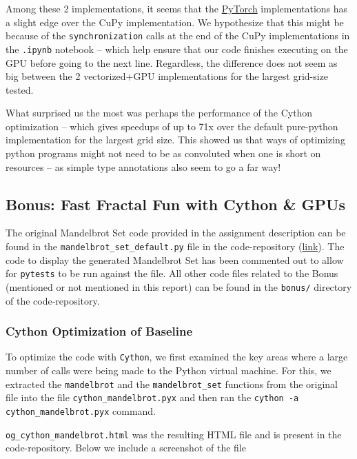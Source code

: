 \documentclass[a4paper,12pt]{article}
\begin{document}
Among these 2 implementations, it seems that the \underline{PyTorch} implementations has a slight edge over the CuPy implementation. We hypothesize that this might be because of the \verb|synchronization| calls at the end of the CuPy implementations in the \verb|.ipynb| notebook -- which help ensure that our code finishes executing on the GPU before going to the next line. Regardless, the difference does not seem as big between the 2 vectorized+GPU implementations for the largest grid-size tested. 

What surprised us the most was perhaps the performance of the Cython optimization -- which gives speedups of up to 71x over the default pure-python implementation for the largest grid size. This showed us that ways of optimizing python programs might not need to be as convoluted when one is short on resources -- as simple type annotations also seem to go a far way!

\subsection{Bonus: Fast Fractal Fun with Cython \& GPUs}
The original Mandelbrot Set code provided in the assignment description can be found in the \verb|mandelbrot_set_default.py| file in the code-repository (\href{https://github.com/paulmyr/DD2358-HPC25/blob/master/03_compgpu/bonus/mandelbrot_set_default.py}{link}). The code to display the generated Mandelbrot Set has been commented out to allow for \verb|pytests| to be run against the file. All other code files related to the Bonus (mentioned or not mentioned in this report) can be found in the \verb|bonus/| directory of the code-repository.

\subsubsection{Cython Optimization of Baseline}
To optimize the code with \verb|Cython|, we first examined the key areas where a large number of calls were being made to the Python virtual machine. For this, we extracted the \verb|mandelbrot| and the \verb|mandelbrot_set| functions from the original file into the file \verb|cython_mandelbrot.pyx| and then ran the \verb|cython -a cython_mandelbrot.pyx| command. 

\verb|og_cython_mandelbrot.html| was the resulting HTML file and is present in the code-repository. Below we include a screenshot of the file
\end{document}
